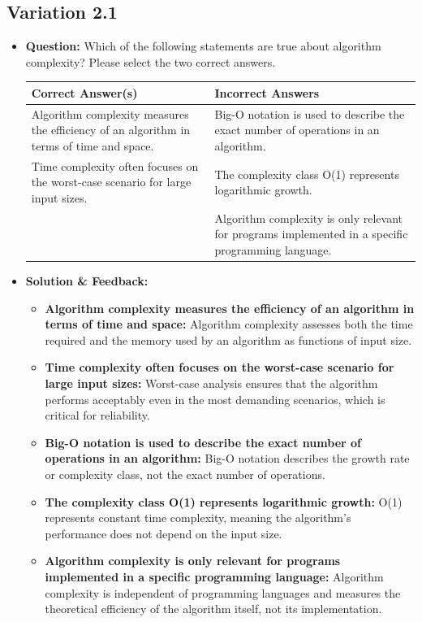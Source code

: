 \subsection{Variation 2.1}
\begin{itemize}
    \item \textbf{Question:} Which of the following statements are true about algorithm complexity? Please select the two correct answers.
    
    \begin{tabularx}{\textwidth}{|X|X|}
        \hline
        \textbf{Correct Answer(s)} & \textbf{Incorrect Answers} \\
        \hline
        Algorithm complexity measures the efficiency of an algorithm in terms of time and space. & Big-O notation is used to describe the exact number of operations in an algorithm. \\
        Time complexity often focuses on the worst-case scenario for large input sizes. & The complexity class O(1) represents logarithmic growth. \\
         & Algorithm complexity is only relevant for programs implemented in a specific programming language. \\
        \hline
    \end{tabularx}
    
    \item \textbf{Solution \& Feedback:}
    \begin{itemize}
        \item \textbf{Algorithm complexity measures the efficiency of an algorithm in terms of time and space:} Algorithm complexity assesses both the time required and the memory used by an algorithm as functions of input size.
        \item \textbf{Time complexity often focuses on the worst-case scenario for large input sizes:} Worst-case analysis ensures that the algorithm performs acceptably even in the most demanding scenarios, which is critical for reliability.
        \item \textbf{Big-O notation is used to describe the exact number of operations in an algorithm:} Big-O notation describes the growth rate or complexity class, not the exact number of operations.
        \item \textbf{The complexity class O(1) represents logarithmic growth:} O(1) represents constant time complexity, meaning the algorithm's performance does not depend on the input size.
        \item \textbf{Algorithm complexity is only relevant for programs implemented in a specific programming language:} Algorithm complexity is independent of programming languages and measures the theoretical efficiency of the algorithm itself, not its implementation.
    \end{itemize}
\end{itemize}

